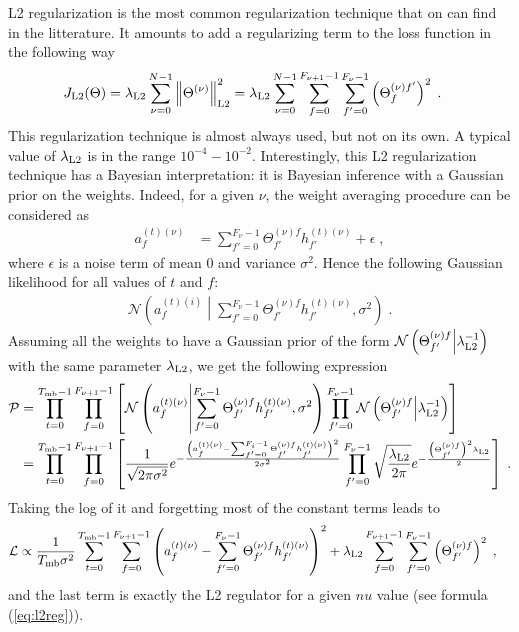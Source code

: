 L2 regularization is the most common regularization technique that on can find in the litterature. It amounts to add a regularizing term to the loss function in the following way
\begin{align}
J_{{\rm L2}}(\Theta)&=\lambda_{{\rm L2}} \sum_{\nu=0}^{N-1}\left\|\Theta^{(\nu)}\right\|^2_{{\rm L2}}
%
=\lambda_{{\rm L2}}\sum_{\nu=0}^{N-1}\sum_{f=0}^{F_{\nu+1}-1}\sum_{f'=0}^{F_\nu-1}
%
\left(\Theta^{(\nu)f'}_{f}\right)^2\;.\label{eq:l2reg}
\end{align}
This regularization technique is almost always used, but not on its own. A typical value of $\lambda_{{\rm L2}}$ is in the range $10^{-4}-10^{-2}$. Interestingly, this L2 regularization technique has a Bayesian interpretation: it is Bayesian inference with a Gaussian prior on the weights. Indeed, for a given $\nu$, the weight averaging procedure can be considered as
\begin{align}
a_{f}^{(t)(\nu)}&=\sum^{F_\nu-1}_{f'=0}\Theta^{(\nu)f}_{f'}h^{(t)(\nu)}_{f'}+\epsilon\;,
\end{align}
where $\epsilon$ is a noise term of mean $0$ and variance $\sigma^2$. Hence the following Gaussian likelihood for all values of $t$ and $f$:
\begin{align}
\mathcal{N}\left(a_{f}^{(t)(i)}\middle|\sum^{F_\nu-1}_{f'=0}\Theta^{(\nu)f}_{f'}h^{(t)(\nu)}_{f'},\sigma^2\right)\;.
\end{align}
Assuming all the weights to have a Gaussian prior of the form $\mathcal{N}\left(\Theta^{(\nu)f}_{f'}\middle|\lambda_{{\rm L2}}^{-1}\right)$ with the same parameter $\lambda_{{\rm L2}}$, we get the following expression
\begin{align}
\mathcal{P}&=
%
\prod_{t=0}^{T_{{\rm mb}}-1}\prod_{f=0}^{F_{\nu+1}-1}\left[\mathcal{N}\left(a_{f}^{(t)(\nu)}\middle|
%
\sum^{F_\nu-1}_{f'=0}\Theta^{(\nu)f}_{f'}h^{(t)(\nu)}_{f'},\sigma^2\right)
%
\prod_{f'=0}^{F_{\nu}-1}\mathcal{N}\left(\Theta^{(\nu)f}_{f'}
%
\middle|\lambda_{{\rm L2}}^{-1}\right)\right]\notag\\
%
&=\prod_{t=0}^{T_{{\rm mb}}-1}\prod_{f=0}^{F_{\nu+1}-1}\left[\frac{1}{\sqrt{2\pi \sigma^2}}
%
e^{-\frac{\left(a_{f}^{(t)(\nu)}-\sum^{F_i-1}_{f'=0}\Theta^{(\nu)f}_{f'}h^{(t)(\nu)}_{f'}\right)^2}{2\sigma^2}}
%
\prod_{f'=0}^{F_{\nu}-1}\sqrt{\frac{\lambda_{{\rm L2}}}{2\pi}}e^{-\frac{\left(\Theta^{(\nu)f}_{f'}\right)^2\lambda_{{\rm L2}}}{2}}\right] \;.
\end{align}
Taking the log of it and forgetting most of the constant terms leads to
\begin{align}
\mathcal{L}&\propto\frac{1}{T_{{\rm mb}}\sigma^2}
%
\sum_{t=0}^{T_{{\rm mb}}-1}\sum_{f=0}^{F_{\nu+1}-1}
%
\left(a_{f}^{(t)(\nu)}-\sum^{F_\nu-1}_{f'=0}\Theta^{(\nu)f}_{f'}h^{(t)(\nu)}_{f'}\right)^2
%
+\lambda_{{\rm L2}}\sum_{f=0}^{F_{\nu+1}-1}\sum_{f'=0}^{F_{\nu}-1}\left(\Theta^{(\nu)f}_{f'}\right)^2 \;,
\end{align}
and the last term is exactly the L2 regulator for a given $nu$ value (see formula (\ref{eq:l2reg})).

